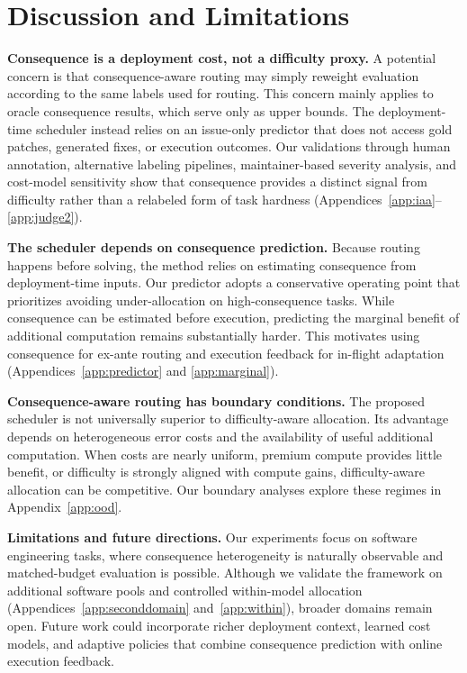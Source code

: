 \documentclass{article}
\begin{document}
\section{Discussion and Limitations}
\label{sec:discussion}

\textbf{Consequence is a deployment cost, not a difficulty proxy.}
A potential concern is that consequence-aware routing may simply
reweight evaluation according to the same labels used for routing.
This concern mainly applies to oracle consequence results, which serve
only as upper bounds. The deployment-time scheduler instead relies on
an issue-only predictor that does not access gold patches, generated
fixes, or execution outcomes. Our validations through human annotation,
alternative labeling pipelines, maintainer-based severity analysis,
and cost-model sensitivity show that consequence provides a distinct
signal from difficulty rather than a relabeled form of task hardness
(Appendices~\ref{app:iaa}--\ref{app:judge2}).


\textbf{The scheduler depends on consequence prediction.}
Because routing happens before solving, the method relies on estimating
consequence from deployment-time inputs. Our predictor adopts a
conservative operating point that prioritizes avoiding
under-allocation on high-consequence tasks. While consequence can be
estimated before execution, predicting the marginal benefit of
additional computation remains substantially harder. This motivates
using consequence for ex-ante routing and execution feedback for
in-flight adaptation (Appendices~\ref{app:predictor} and
\ref{app:marginal}).


\textbf{Consequence-aware routing has boundary conditions.}
The proposed scheduler is not universally superior to difficulty-aware
allocation. Its advantage depends on heterogeneous error costs and the
availability of useful additional computation. When costs are nearly
uniform, premium compute provides little benefit, or difficulty is
strongly aligned with compute gains, difficulty-aware allocation can
be competitive. Our boundary analyses explore these regimes in
Appendix~\ref{app:ood}.


\textbf{Limitations and future directions.}
Our experiments focus on software engineering tasks, where consequence
heterogeneity is naturally observable and matched-budget evaluation is
possible. Although we validate the framework on additional software
pools and controlled within-model allocation
(Appendices~\ref{app:seconddomain} and~\ref{app:within}), broader
domains remain open. Future work could incorporate richer deployment
context, learned cost models, and adaptive policies that combine
consequence prediction with online execution feedback.
\end{document}
